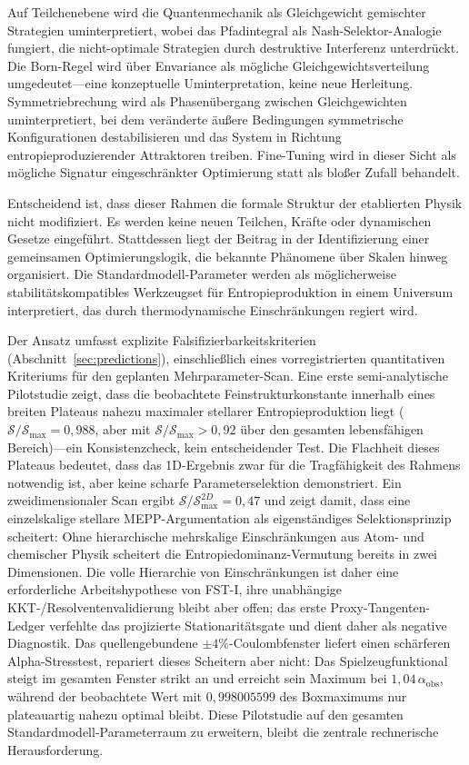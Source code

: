 \documentclass[12pt,a4paper]{article}
\theoremstyle{remark}
\begin{document}
Auf Teilchenebene wird die Quantenmechanik als Gleichgewicht gemischter Strategien uminterpretiert, wobei das Pfadintegral als Nash-Selektor-Analogie fungiert, die nicht-optimale Strategien durch destruktive Interferenz unterdr\"uckt. Die Born-Regel wird \"uber Envariance als m\"ogliche Gleichgewichtsverteilung umgedeutet---eine konzeptuelle Uminterpretation, keine neue Herleitung. Symmetriebrechung wird als Phasen\"ubergang zwischen Gleichgewichten uminterpretiert, bei dem ver\"anderte \"au\ss{}ere Bedingungen symmetrische Konfigurationen destabilisieren und das System in Richtung entropieproduzierender Attraktoren treiben. Fine-Tuning wird in dieser Sicht als m\"ogliche Signatur eingeschr\"ankter Optimierung statt als blo\ss{}er Zufall behandelt.

Entscheidend ist, dass dieser Rahmen die formale Struktur der etablierten Physik nicht modifiziert. Es werden keine neuen Teilchen, Kr\"afte oder dynamischen Gesetze eingef\"uhrt. Stattdessen liegt der Beitrag in der Identifizierung einer gemeinsamen Optimierungslogik, die bekannte Ph\"anomene \"uber Skalen hinweg organisiert. Die Standardmodell-Parameter werden als m\"oglicherweise stabilit\"atskompatibles Werkzeugset f\"ur Entropieproduktion in einem Universum interpretiert, das durch thermodynamische Einschr\"ankungen regiert wird.

Der Ansatz umfasst explizite Falsifizierbarkeitskriterien (Abschnitt~\ref{sec:predictions}), einschlie\ss{}lich eines vorregistrierten quantitativen Kriteriums f\"ur den geplanten Mehrparameter-Scan. Eine erste semi-analytische Pilotstudie zeigt, dass die beobachtete Feinstrukturkonstante innerhalb eines breiten Plateaus nahezu maximaler stellarer Entropieproduktion liegt ($\mathcal{S}/\mathcal{S}_{\max} = 0{,}988$, aber mit $\mathcal{S}/\mathcal{S}_{\max} > 0{,}92$ \"uber den gesamten lebensf\"ahigen Bereich)---ein Konsistenzcheck, kein entscheidender Test. Die Flachheit dieses Plateaus bedeutet, dass das 1D-Ergebnis zwar f\"ur die Tragf\"ahigkeit des Rahmens notwendig ist, aber keine scharfe Parameterselektion demonstriert. Ein zweidimensionaler Scan ergibt $\mathcal{S}/\mathcal{S}_{\max}^{2D} = 0{,}47$ und zeigt damit, dass eine einzelskalige stellare MEPP-Argumentation als eigenst\"andiges Selektionsprinzip scheitert: Ohne hierarchische mehrskalige Einschr\"ankungen aus Atom- und chemischer Physik scheitert die Entropiedominanz-Vermutung bereits in zwei Dimensionen. Die volle Hierarchie von Einschr\"ankungen ist daher eine erforderliche Arbeitshypothese von FST-I, ihre unabh\"angige KKT-/Resolventenvalidierung bleibt aber offen; das erste Proxy-Tangenten-Ledger verfehlte das projizierte Stationarit\"atsgate und dient daher als negative Diagnostik. Das quellengebundene $\pm4\%$-Coulombfenster liefert einen sch\"arferen Alpha-Stresstest, repariert dieses Scheitern aber nicht: Das Spielzeugfunktional steigt im gesamten Fenster strikt an und erreicht sein Maximum bei $1{,}04\,\alpha_{\mathrm{obs}}$, w\"ahrend der beobachtete Wert mit $0{,}998005599$ des Boxmaximums nur plateauartig nahezu optimal bleibt. Diese Pilotstudie auf den gesamten Standardmodell-Parameterraum zu erweitern, bleibt die zentrale rechnerische Herausforderung.
\end{document}
